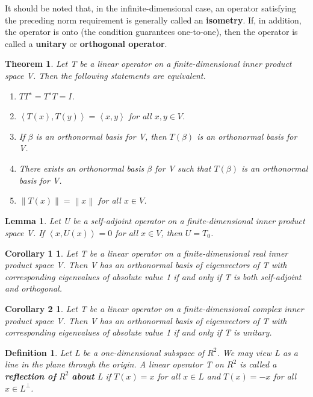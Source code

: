 \documentclass{article}
\newcommand{\norm}[1]{\left\lVert#1\right\rVert}
\newcommand{\bd}[1]{\textbf{#1}}
\newcommand{\ip}[1]{\left\langle {#1}\right\rangle} %
\newcommand{\enumalph}[0]{\begin{enumerate}[label=(\alph*)]}
\theoremstyle{plain}
\newtheorem{theorem}{Theorem}[section]
\newtheorem*{lemma}{Lemma}
\newtheorem*{corollary1}{Corollary 1}
\newtheorem*{corollary2}{Corollary 2}
\newtheorem*{definition1}{Definition}
\theoremstyle{plain} %
\begin{document}
It should be noted that, in the infinite-dimensional case, an operator satisfying the preceding norm requirement is generally called an \bd{isometry}. If, in addition, the operator is onto (the condition guarantees one-to-one), then the operator is called a \bd{unitary} or \bd{orthogonal operator}.

\begin{theorem}
  Let T be a linear operator on a finite-dimensional inner product space V. Then the following statements are equivalent.
  \enumalph
  \item $TT^∗ = T^∗T = I$.
  \item $\ip{T(x),T(y)} = \ip{x, y}$ for all $x, y \in V$.
  \item If $\beta$ is an orthonormal basis for V, then $T(\beta)$ is an orthonormal basis for V.
  \item There exists an orthonormal basis $\beta$ for V such that $T(\beta)$ is an orthonormal basis for V.
  \item $\norm{T(x)} = \norm{x}$ for all $x \in V$.
  \end{enumerate}
\end{theorem}

\begin{lemma}
  Let U be a self-adjoint operator on a finite-dimensional inner product space V. If $\ip{x,U(x)} = 0$ for all $x \in V$, then $U = T_0$.
\end{lemma}

\begin{corollary1}
  Let T be a linear operator on a finite-dimensional real inner product space V. Then V has an orthonormal basis of eigenvectors of T with corresponding eigenvalues of absolute value 1 if and only if T is both self-adjoint and orthogonal.
\end{corollary1}

\begin{corollary2}
  Let T be a linear operator on a finite-dimensional complex inner product space V. Then V has an orthonormal basis of eigenvectors of T with corresponding eigenvalues of absolute value 1 if and only if T is unitary.
\end{corollary2}

\begin{definition1}
  Let L be a one-dimensional subspace of $R^2$. We may view L as a line in the plane through the origin. A linear operator T on $R^2$ is called a \bd{reflection of} $R^2$ \bd{about} L if $T(x) = x$ for all $x \in L$ and $T(x) = −x$ for all $x \in L^\perp$.
\end{definition1}
\end{document}
